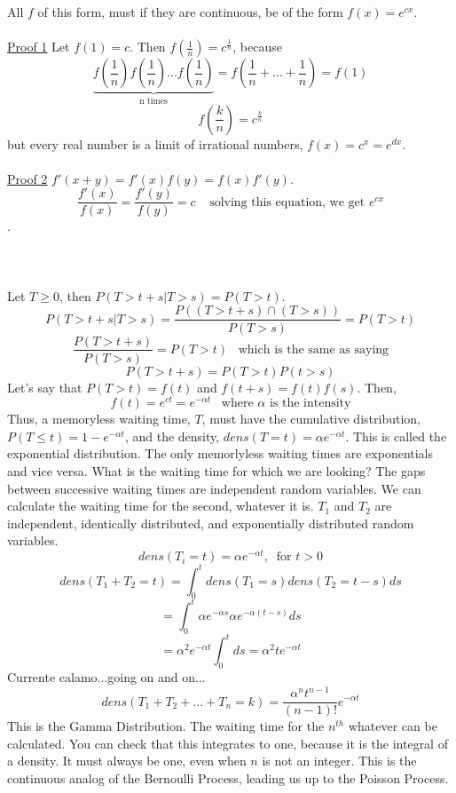 All $f$ of this form, must if they are continuous, be of the form $f(x)=e^{cx}$.  \\\\
\noindent\underline{Proof 1}  Let $f(1)=c$.  Then $f\left(\frac{1}{n}\right)=c^\frac{1}{n}$, because 
$$\underbrace{f\left(\frac{1}{n}\right)f\left(\frac{1}{n}\right)...f\left(\frac{1}{n}\right)}_{\mbox{n times}}=f\left(\frac{1}{n}+...+\frac{1}{n}\right)=f(1)$$
$$f\left(\frac{k}{n}\right)=c^\frac{k}{n}$$
but every real number is a limit of irrational numbers, $f(x)=c^x=e^{dx}$.\\\\
\noindent\underline{Proof 2}  $f\prime(x+y)=f\prime(x)f(y)=f(x)f\prime(y)$.
$$\frac{f\prime(x)}{f(x)}=\frac{f\prime(y)}{f(y)}=c\;\;\;\;\mbox{solving this equation, we get $e^{cx}$}$$.\\\\
\\\\
Let $T\geq 0$, then $P(T>t+s|T>s)=P(T>t)$.  
$$P(T>t+s|T>s)=\frac{P((T>t+s)\cap(T>s))}{P(T>s)}=P(T>t)$$
$$\frac{P(T>t+s)}{P(T>s)}=P(T>t)\;\;\;\mbox{which is the same as saying}$$
$$P(T>t+s)=P(T>t)P(t>s)$$
Let's say that $P(T>t)=f(t)$ and $f(t+s)=f(t)f(s)$.  Then,
$$f(t)=e^{ct}=e^{- \alpha t}\;\;\;\mbox{where $\alpha$ is the intensity}$$
Thus, a memoryless waiting time, $T$, must have the cumulative distribution, $P(T\leq t)=1-e^{- \alpha t}$, and the density, $dens(T=t)=\alpha e^{- \alpha t}$.  This is called the exponential distribution.  The only memorlyless waiting times are exponentials and vice versa.  What is the waiting time for which we are looking?  The gaps between successive waiting times are independent random variables.  We can calculate the waiting time for the second, whatever it is.
$T_1$ and $T_2$ are independent, identically distributed, and exponentially distributed random variables.  
$$dens(T_i=t)=\alpha e^{-\alpha t},\;\;\mbox{for $t>0$}$$
$$dens(T_1+T_2=t)=\int_0^t\!\! dens(T_1=s)dens(T_2=t-s)ds$$
$$=\int_0^t\!\!\alpha e^{-\alpha s}\alpha e^{-\alpha (t-s)}ds$$
$$={\alpha}^2 e^{-\alpha t}\int_0^t\!\!\!ds={\alpha}^2te^{-\alpha t}$$
Currente calamo...going on and on...
$$dens(T_1+T_2+...+T_n=k)=\frac{{\alpha}^n t^{n-1}}{(n-1)!}e^{-\alpha t}$$
This is the Gamma Distribution.  The waiting time for the $n^{th}$ whatever can be calculated.  You can check that this integrates to one, because it is the integral of a density.  It must always be one, even when $n$ is not an integer.  This is the continuous analog of the Bernoulli Process, leading us up to the Poisson Process.

